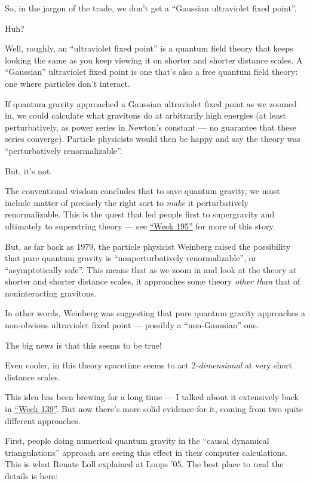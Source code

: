 \documentclass{article}
\begin{document}
So, in the jargon of the trade, we don't get a ``Gaussian ultraviolet
fixed point''.

Huh?

Well, roughly, an ``ultraviolet fixed point'' is a quantum field theory
that keeps looking the same as you keep viewing it on shorter and
shorter distance scales. A ``Gaussian'' ultraviolet fixed point is one
that's also a free quantum field theory: one where particles don't
interact.

If quantum gravity approached a Gaussian ultraviolet fixed point as we
zoomed in, we could calculate what gravitons do at arbitrarily high
energies (at least perturbatively, as power series in Newton's constant
--- no guarantee that these series converge). Particle physicists would
then be happy and say the theory was ``perturbatively renormalizable''.

But, it's not.

The conventional wisdom concludes that to save quantum gravity, we must
include matter of precisely the right sort to \emph{make} it
perturbatively renormalizable. This is the quest that led people first
to supergravity and ultimately to superstring theory --- see
\protect\hyperlink{week195}{``Week 195''} for more of this story.

But, as far back as 1979, the particle physicist Weinberg raised the
possibility that pure quantum gravity is ``nonperturbatively
renormalizable'', or ``asymptotically safe''. This means that as we zoom
in and look at the theory at shorter and shorter distance scales, it
approaches some theory \emph{other than} that of noninteracting
gravitons.

In other words, Weinberg was suggesting that pure quantum gravity
approaches a non-obvious ultraviolet fixed point --- possibly a
``non-Gaussian'' one.

The big news is that this seems to be true!

Even cooler, in this theory spacetime seems to act
\emph{\(2\)-dimensional} at very short distance scales.

This idea has been brewing for a long time --- I talked about it
extensively back in \protect\hyperlink{week139}{``Week 139''}. But now
there's more solid evidence for it, coming from two quite different
approaches.

First, people doing numerical quantum gravity in the ``causal dynamical
triangulations'' approach are seeing this effect in their computer
calculations. This is what Renate Loll explained at Loops '05. The best
place to read the details is here:
\end{document}
